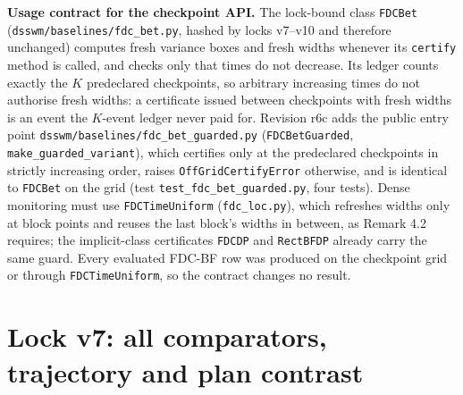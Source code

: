 \documentclass[sigconf,anonymous,review]{acmart}
\begin{document}
\textbf{Usage contract for the checkpoint API.} The lock-bound class \texttt{FDCBet} (\texttt{dsswm/baselines/fdc\_bet.py}, hashed by locks v7--v10 and therefore unchanged) computes fresh variance boxes and fresh widths whenever its \texttt{certify} method is called, and checks only that times do not decrease. Its ledger counts exactly the $K$ predeclared checkpoints, so arbitrary increasing times do not authorise fresh widths: a certificate issued between checkpoints with fresh widths is an event the $K$-event ledger never paid for. Revision r6c adds the public entry point \texttt{dsswm/baselines/fdc\_bet\_guarded.py} (\texttt{FDCBetGuarded}, \texttt{make\_guarded\_variant}), which certifies only at the predeclared checkpoints in strictly increasing order, raises \texttt{OffGridCertifyError} otherwise, and is identical to \texttt{FDCBet} on the grid (test \texttt{test\_fdc\_bet\_guarded.py}, four tests). Dense monitoring must use \texttt{FDCTimeUniform} (\texttt{fdc\_loc.py}), which refreshes widths only at block points and reuses the last block's widths in between, as Remark 4.2 requires; the implicit-class certificates \texttt{FDCDP} and \texttt{RectBFDP} already carry the same guard. Every evaluated FDC-BF row was produced on the checkpoint grid or through \texttt{FDCTimeUniform}, so the contract changes no result.

\clearpage
\section{Lock v7: all comparators, trajectory and plan contrast}\label{app:v7full}
\end{document}
